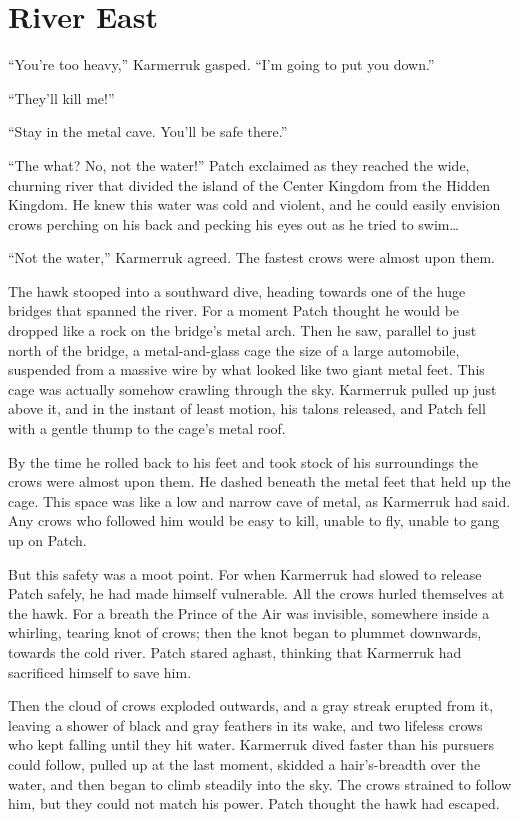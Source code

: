\documentclass[12pt]{memoir}
\begin{document}

\section{River East}

“You’re too heavy,” Karmerruk gasped. “I’m going to put you down.”

“They’ll kill me!”

“Stay in the metal cave. You’ll be safe there.”

“The what? No, not the water!” Patch exclaimed as they reached the
wide, churning river that divided the island of the Center Kingdom
from the Hidden Kingdom. He knew this water was cold and violent, and
he could easily envision crows perching on his back and pecking his
eyes out as he tried to swim…

“Not the water,” Karmerruk agreed. The fastest crows were almost upon
them.

The hawk stooped into a southward dive, heading towards one of the
huge bridges that spanned the river. For a moment Patch thought he
would be dropped like a rock on the bridge’s metal arch. Then he saw,
parallel to just north of the bridge, a metal-and-glass cage the size
of a large automobile, suspended from a massive wire by what looked
like two giant metal feet. This cage was actually somehow crawling
through the sky. Karmerruk pulled up just above it, and in the instant
of least motion, his talons released, and Patch fell with a gentle
thump to the cage’s metal roof.

By the time he rolled back to his feet and took stock of his
surroundings the crows were almost upon them. He dashed beneath the
metal feet that held up the cage. This space was like a low and narrow
cave of metal, as Karmerruk had said. Any crows who followed him would
be easy to kill, unable to fly, unable to gang up on Patch.

But this safety was a moot point. For when Karmerruk had slowed to
release Patch safely, he had made himself vulnerable. All the crows
hurled themselves at the hawk. For a breath the Prince of the Air was
invisible, somewhere inside a whirling, tearing knot of crows; then
the knot began to plummet downwards, towards the cold river. Patch
stared aghast, thinking that Karmerruk had sacrificed himself to save
him.

Then the cloud of crows exploded outwards, and a gray streak erupted
from it, leaving a shower of black and gray feathers in its wake, and
two lifeless crows who kept falling until they hit water. Karmerruk
dived faster than his pursuers could follow, pulled up at the last
moment, skidded a hair’s-breadth over the water, and then began to
climb steadily into the sky. The crows strained to follow him, but
they could not match his power. Patch thought the hawk had escaped.
\end{document}
